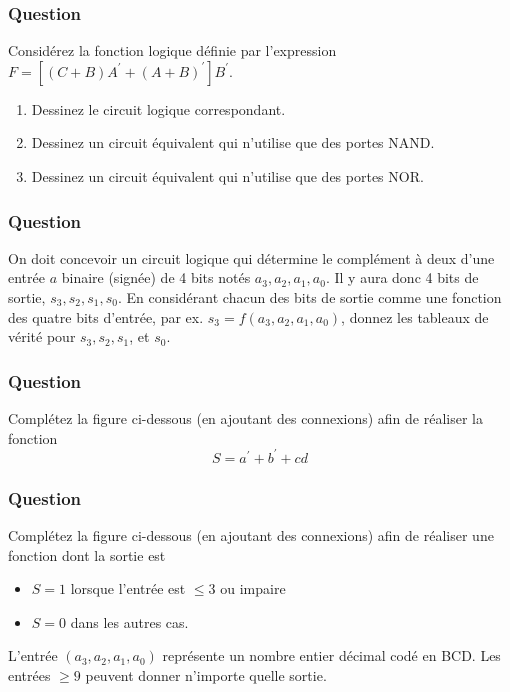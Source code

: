 \documentclass[11pt]{article}
\begin{document}
\subsubsection*{Question}
\label{sec:orga35fa19}
Considérez la fonction logique définie par l'expression \(F =
      [ (C + B) A^{\prime} + (A+B)^{\prime} ] B^{\prime}\).

\begin{enumerate}
\item Dessinez le circuit logique correspondant.

\item Dessinez un circuit équivalent qui n'utilise que des portes
NAND.

\item Dessinez un circuit équivalent qui n'utilise que des portes
NOR.
\end{enumerate}

\subsubsection*{Question}
\label{sec:org0e6d4f0}
On doit concevoir un circuit logique qui détermine le complément à deux
  d'une entrée \(a\) binaire (signée) de 4 bits notés
  \(a_3, a_2, a_1, a_0\). Il y aura donc 4 bits de sortie, \(s_3,
      s_2, s_1, s_0\). En considérant chacun des bits de sortie comme une
  fonction des quatre bits d'entrée, par ex. \(s_3 = f(a_3, a_2, a_1,
      a_0)\), donnez les tableaux de vérité pour \(s_3, s_2, s_1\), et \(s_0\).

\subsubsection*{Question}
\label{sec:orgc6ee177}
Complétez la figure ci-dessous (en ajoutant des connexions) afin de
  réaliser la fonction 
  $$
    S= a^\prime + b^\prime + c d
    $$
  \begin{center}

\end{center}

\subsubsection*{Question}
\label{sec:orgfb7dc7d}
Complétez la figure ci-dessous (en ajoutant des connexions) afin de
  réaliser une fonction dont la sortie est 
\begin{itemize}
\item \(S=1\) lorsque l'entrée est \(\leq 3\) ou impaire
\item \(S=0\) dans les autres cas.
\end{itemize}
    L'entrée \((a_3,a_2,a_1, a_0)\) représente un nombre entier
   décimal codé en BCD. Les entrées \(\geq 9\) peuvent donner
   n'importe quelle sortie.
\begin{center}

\end{center}
\end{document}
